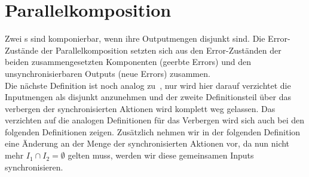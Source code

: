 \section{Parallelkomposition}
Zwei \EIO{}s sind komponierbar, wenn ihre Outputmengen disjunkt sind. Die
Error-Zustände der Parallelkomposition setzten sich aus den Error-Zuständen der
beiden zusammengesetzten Komponenten (geerbte Errors) und den
unsynchronisierbaren Outputs (neue Errors) zusammen.\\
Die nächste Definition ist noch analog zu~\cite{Vogler2014EIO}, nur wird hier
darauf verzichtet die Inputmengen als disjunkt anzunehmen und der zweite
Definitionsteil über das verbergen der synchronisierten Aktionen wird
komplett weg gelassen. Das verzichten auf die analogen Definitionen für das
Verbergen wird sich auch bei den folgenden Definitionen zeigen. Zusätzlich
nehmen wir in der folgenden Definition eine Änderung an der Menge der
synchronisierten Aktionen vor, da nun nicht mehr $I_1\cap I_2 =\emptyset$
gelten muss, werden wir diese gemeinsamen Inputs synchronisieren. %

